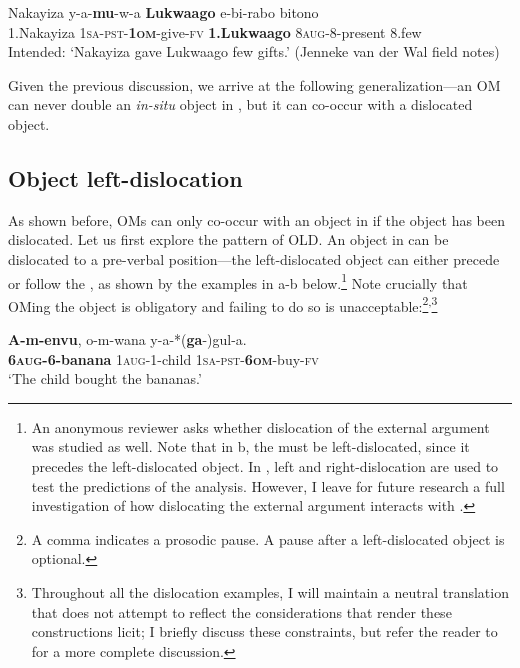 \documentclass[output=paper
,newtxmath
,modfonts
,nonflat]{langsci/langscibook}
\begin{document}
\ea\label{ex:ranero:13}
\gll *Nakayiza  y-a-\textbf{mu}{}-w-a                   \textbf{Lukwaago}    e-bi-rabo            bitono\\
1.Nakayiza \textsc{1sa-pst-}\textbf{\textsc{1om}}{}-give-\textsc{fv} \textbf{1.Lukwaago} 8\textsc{aug}{}-8-present 8.few\\
\glt Intended: ‘Nakayiza gave Lukwaago few gifts.’ (Jenneke van der Wal field notes)
\z

Given the previous discussion, we arrive at the following generalization—an OM can never double an \textit{in-situ} object in , but it can co-occur with a dislocated object.

\subsection{Object left-dislocation}\label{sec:ranero:3.2}

As shown before, OMs can only co-occur with an object in  if the object has been dislocated. Let us first explore the pattern of OLD. An object in  can be dislocated to a pre-verbal position—the left-dislocated object can either precede or follow the , as shown by the examples in a-b below.\footnote{An anonymous reviewer asks whether dislocation of the external argument was studied as well. Note that in b, the  must be left-dislocated, since it precedes the left-dislocated object. In ,  left and right-dislocation are used to test the predictions of the analysis. However, I leave for future research a full investigation of how dislocating the external argument interacts with .} Note crucially that OMing the object is obligatory and failing to do so is unacceptable:\footnote{A comma indicates a prosodic pause. A pause after a left-dislocated object is optional.}\textsuperscript{,}\footnote{Throughout all the dislocation examples, I will maintain a neutral translation that does not attempt to reflect the  considerations that render these constructions licit; I briefly discuss these  constraints, but refer the reader to \citet{ranero2015} for a more complete discussion.}

\ea\label{ex:ranero:14}
\ea\label{ex:ranero:14a}
\gll \textbf{A-m-envu},         o-m-wana       y-a-*(\textbf{ga}{}-)gul-a.\\
\textbf{6\textsc{aug}}\textbf{{}-6-banana} 1\textsc{aug}{}-1-child \textsc{1sa-pst-}\textbf{\textsc{6om}}{}-buy-\textsc{fv}\\
\glt ‘The child bought the bananas.’
\end{document}
